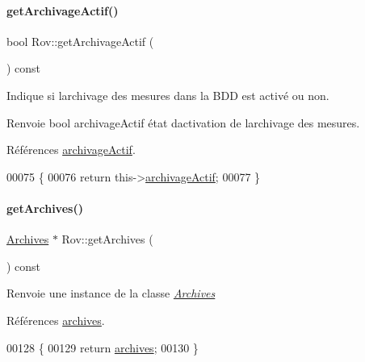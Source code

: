 \paragraph{\texorpdfstring{get\+Archivage\+Actif()}{getArchivageActif()}}
{\footnotesize\ttfamily bool Rov\+::get\+Archivage\+Actif (\begin{DoxyParamCaption}{ }\end{DoxyParamCaption}) const}

Indique si l\textquotesingle{}archivage des mesures dans la B\+DD est activé ou non.

\begin{DoxyReturn}{Renvoie}
bool archivage\+Actif état d\textquotesingle{}activation de l\textquotesingle{}archivage des mesures. 
\end{DoxyReturn}


Références \hyperlink{class_rov_a659da5fe3636356b006a8e08a8433dd3}{archivage\+Actif}.


\begin{DoxyCode}
00075 \{
00076     \textcolor{keywordflow}{return} this->\hyperlink{class_rov_a659da5fe3636356b006a8e08a8433dd3}{archivageActif};
00077 \}
\end{DoxyCode}
\mbox{\label{class_rov_af0936fd10d04851d53f28575ecd1da3f}} 
\paragraph{\texorpdfstring{get\+Archives()}{getArchives()}}
{\footnotesize\ttfamily \hyperlink{class_archives}{Archives} $\ast$ Rov\+::get\+Archives (\begin{DoxyParamCaption}{ }\end{DoxyParamCaption}) const}

\begin{DoxyReturn}{Renvoie}
une instance de la classe {\itshape \hyperlink{class_archives}{Archives}} 
\end{DoxyReturn}


Références \hyperlink{class_rov_ad41ed46f169f28da226a979f70c4d8a4}{archives}.


\begin{DoxyCode}
00128 \{
00129     \textcolor{keywordflow}{return} \hyperlink{class_rov_ad41ed46f169f28da226a979f70c4d8a4}{archives};
00130 \}
\end{DoxyCode}
\mbox{\label{class_rov_aae07e8ca2c4b3be6a0a378b6f072c60b}} 
